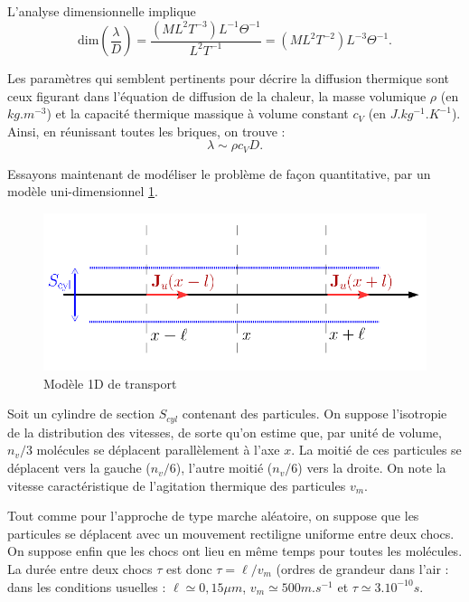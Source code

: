 \documentclass[11pt,a4paper]{report}
\begin{document}
L'analyse dimensionnelle implique
\begin{equation}
	\text{dim}\left(\frac{\lambda}{D}\right) = \frac{(ML^2T^{-3})L^{-1}\Theta^{-1}}{L^2 T^{-1}} = (ML^2T^{-2})L^{-3}\Theta^{-1}.
\end{equation}

Les paramètres qui semblent pertinents pour décrire la diffusion thermique sont ceux figurant dans l'équation de diffusion de la chaleur, la masse volumique $\rho$ (en $kg.m^{-3}$) et la capacité thermique massique à volume constant $c_V$ (en $J.kg^{-1}.K^{-1}$). Ainsi, en réunissant toutes les briques, on trouve :
\begin{equation}
	\lambda \sim \rho c_V D.
\end{equation}

Essayons maintenant de modéliser le problème de façon quantitative, par un modèle uni-dimensionnel \ref{fig:transport_1Dmicromodel}. 

\begin{figure}[h!]
	\includegraphics[scale = 0.8]{micro_cond.png}
	\caption{Modèle 1D de transport} 
	\label{fig:transport_1Dmicromodel}
\end{figure}

Soit un cylindre de section $S_{cyl}$ contenant des particules. On suppose l'isotropie de la distribution des vitesses, de sorte qu'on estime que, par unité de volume, $n_v/3$ molécules se déplacent parallèlement à l'axe $x$. La moitié de ces particules se déplacent vers la gauche ($n_v/6$), l'autre moitié ($n_v/6$) vers la droite. On note la vitesse caractéristique de l'agitation thermique des particules $v_m$.

Tout comme pour l'approche de type marche aléatoire, on suppose que les particules se déplacent avec un mouvement rectiligne uniforme entre deux chocs. On suppose enfin que les chocs ont lieu en même temps pour toutes les molécules. La durée entre deux chocs $\tau$ est donc $\tau = \ell/v_m$ (ordres de grandeur dans l'air : dans les conditions usuelles : $\ell \simeq 0, 15 \mu m $, $v_m \simeq 500 m.s^{-1}$ et $\tau \simeq 3.10^{-10} s$.\\ 
\end{document}
